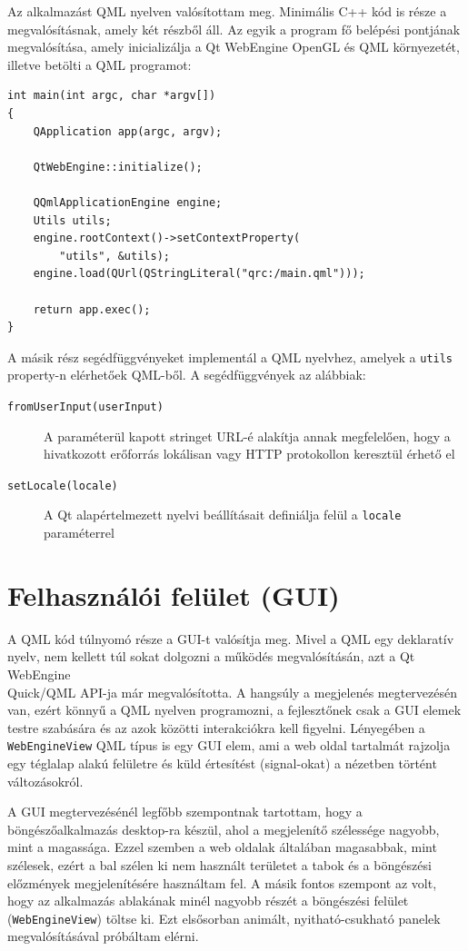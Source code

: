\documentclass[12pt]{report}
\begin{document}
Az alkalmazást QML nyelven valósítottam meg. Minimális C++ kód is része a megvalósításnak,
amely két részből áll. Az egyik a program fő belépési pontjának megvalósítása, amely
inicializálja a Qt WebEngine OpenGL és QML környezetét, illetve betölti a QML programot:
\begin{verbatim}
int main(int argc, char *argv[])
{
    QApplication app(argc, argv);

    QtWebEngine::initialize();

    QQmlApplicationEngine engine;
    Utils utils;
    engine.rootContext()->setContextProperty(
        "utils", &utils);
    engine.load(QUrl(QStringLiteral("qrc:/main.qml")));

    return app.exec();
}
\end{verbatim}
A másik rész segédfüggvényeket implementál a QML nyelvhez, amelyek a \texttt{utils} \\
property-n elérhetőek QML-ből. A segédfüggvények az alábbiak:
\begin{description}
    \item[\texttt{fromUserInput(userInput)}] A paraméterül kapott stringet URL-é alakítja
        annak megfelelően, hogy a hivatkozott erőforrás lokálisan vagy HTTP protokollon
        keresztül érhető el
    \item[\texttt{setLocale(locale)}] A Qt alapértelmezett nyelvi beállításait definiálja
        felül a \texttt{locale} paraméterrel
\end{description}

\section{Felhasználói felület (GUI)}

A QML kód túlnyomó része a GUI-t valósítja meg. Mivel a QML egy deklaratív nyelv,
nem kellett túl sokat dolgozni a működés megvalósításán, azt a Qt WebEngine \\
Quick/QML API-ja már megvalósította. A hangsúly a megjelenés megtervezésén van,
ezért könnyű a QML nyelven programozni, a fejlesztőnek csak a GUI elemek testre szabására
és az azok közötti interakciókra kell figyelni. Lényegében a \texttt{WebEngineView} QML
típus is egy GUI elem, ami a web oldal tartalmát rajzolja egy téglalap alakú felületre és
küld értesítést (signal-okat) a nézetben történt változásokról.

A GUI megtervezésénél legfőbb szempontnak tartottam, hogy a böngészőalkalmazás desktop-ra
készül, ahol a megjelenítő szélessége nagyobb, mint a magassága. Ezzel szemben a web oldalak
általában magasabbak, mint szélesek, ezért a bal szélen ki nem használt területet a tabok
és a böngészési előzmények megjelenítésére használtam fel. A másik fontos szempont az volt,
hogy az alkalmazás ablakának minél nagyobb részét a böngészési felület
(\texttt{WebEngineView}) töltse ki. Ezt elsősorban animált, nyitható-csukható panelek
megvalósításával próbáltam elérni.
\end{document}
